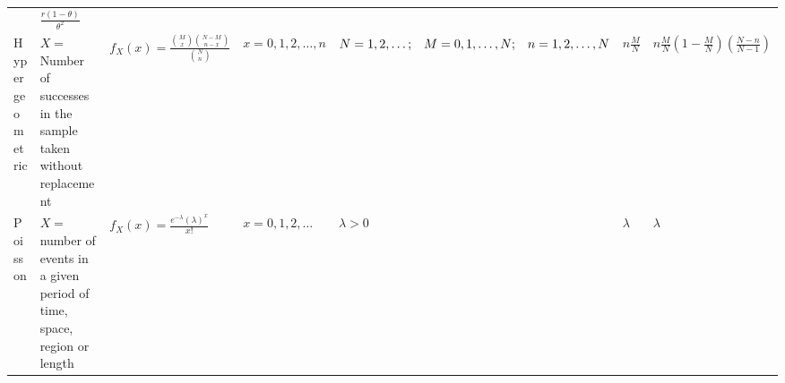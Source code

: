 \documentclass[]{book}
\begin{document}
\begin{landscape}
\begin{longtable}[]{@{}lllllll@{}}
\begin{minipage}[t]{0.05\columnwidth}
\end{minipage} & \begin{minipage}[t]{0.09\columnwidth}\raggedright
\(\frac{r(1-\theta)}{\theta^2}\)\strut
\end{minipage}\tabularnewline
\begin{minipage}[t]{0.10\columnwidth}\raggedright
Hypergeometric\strut
\end{minipage} & \begin{minipage}[t]{0.13\columnwidth}\raggedright
\(X=\) Number of successes in the sample taken without replacement\strut
\end{minipage} & \begin{minipage}[t]{0.16\columnwidth}\raggedright
\(f_X(x)= \frac{{M\choose x}{N-M\choose n-x}}{{N \choose n}}\)\strut
\end{minipage} & \begin{minipage}[t]{0.14\columnwidth}\raggedright
\(x=0,1,2,\dots, n\)\strut
\end{minipage} & \begin{minipage}[t]{0.16\columnwidth}\raggedright
\(N = 1,2,\dots;\;\;\;\;\newline M= 0,1,\dots,N; \;\;\;\; \newline n=1,2,\dots,N\)\strut
\end{minipage} & \begin{minipage}[t]{0.05\columnwidth}\raggedright
\(n\frac{M}{N}\)\strut
\end{minipage} & \begin{minipage}[t]{0.09\columnwidth}\raggedright
\(n\frac{M}{N}\left(1-\frac{M}{N} \right)\left(\frac{N-n}{N-1}\right)\)\strut
\end{minipage}\tabularnewline
\begin{minipage}[t]{0.10\columnwidth}\raggedright
Poisson\strut
\end{minipage} & \begin{minipage}[t]{0.13\columnwidth}\raggedright
\(X=\) number of events in a given period of time, space, region or length\strut
\end{minipage} & \begin{minipage}[t]{0.16\columnwidth}\raggedright
\(f_X(x)= \frac{e^{-\lambda} (\lambda)^x}{x!}\)\strut
\end{minipage} & \begin{minipage}[t]{0.14\columnwidth}\raggedright
\(x=0,1,2,\dots\)\strut
\end{minipage} & \begin{minipage}[t]{0.16\columnwidth}\raggedright
\(\lambda > 0\)\strut
\end{minipage} & \begin{minipage}[t]{0.05\columnwidth}\raggedright
\(\lambda\)\strut
\end{minipage} & \begin{minipage}[t]{0.09\columnwidth}\raggedright
\(\lambda\)\strut
\end{minipage}\tabularnewline
\bottomrule
\end{longtable}


\end{landscape}
\end{document}
